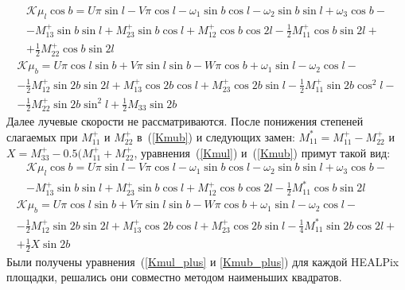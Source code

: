 \documentclass[14pt]{article} %
\begin{document}
\begin{multline}\label{Kmul}
\mathcal{K}\mu_l\cos b=U\pi\sin l-V\pi\cos l-\omega_1\sin b\cos l-\omega_2\sin b\sin l+\omega_3\cos b-\\-M_{13}^+\sin b\sin l+M_{23}^+\sin b\cos l+M_{12}^+\cos b\cos2l-\frac{1}{2}M_{11}^+\cos b\sin2l+\\+\frac{1}{2}M_{22}^+\cos b\sin2l
\end{multline}
\begin{multline}\label{Kmub}
\mathcal{K}\mu_b=U\pi\cos l\sin b+V\pi\sin l\sin b-W\pi\cos b+\omega_1\sin l-\omega_2\cos l-\\-\frac{1}{2}M_{12}^+\sin2b\sin2l+M_{13}^+\cos2b\cos l+M_{23}^+\cos2b\sin l-\frac{1}{2}M_{11}^+\sin2b\cos^2l-\\-\frac{1}{2}M_{22}^+\sin2b\sin^2l+\frac{1}{2}M_{33}\sin2b
\end{multline}
Далее лучевые скорости не рассматриваются. После понижения степеней слагаемых при $M_{11}^+$ и $M_{22}^+$ в~(\ref{Kmub}) и следующих замен: $M_{11}^*=M_{11}^+-M_{22}^+$ и $X=M_{33}^+-0.5(M_{11}^++M_{22}^+$, уравнения~(\ref{Kmul}) и~(\ref{Kmub}) примут такой вид:
\begin{multline}\label{Kmul_plus}
\mathcal{K}\mu_l\cos b=U\pi\sin l-V\pi\cos l-\omega_1\sin b\cos l-\omega_2\sin b\sin l+\omega_3\cos b-\\-M_{13}^+\sin b\sin l+M_{23}^+\sin b\cos l+M_{12}^+\cos b\cos2l-\frac{1}{2}M_{11}^*\cos b\sin2l
\end{multline}
\begin{multline}\label{Kmub_plus}
\mathcal{K}\mu_b=U\pi\cos l\sin b+V\pi\sin l\sin b-W\pi\cos b+\omega_1\sin l-\omega_2\cos l-\\-\frac{1}{2}M_{12}^+\sin2b\sin2l+M_{13}^+\cos2b\cos l+M_{23}^+\cos2b\sin l-\frac{1}{4}M_{11}^*\sin2b\cos2l+\\+\frac{1}{2}X\sin2b
\end{multline}
Были получены уравнения~(\ref{Kmul_plus} и \ref{Kmub_plus}) для каждой HEALPix площадки, решались они совместно методом наименьших квадратов.
\end{document}
